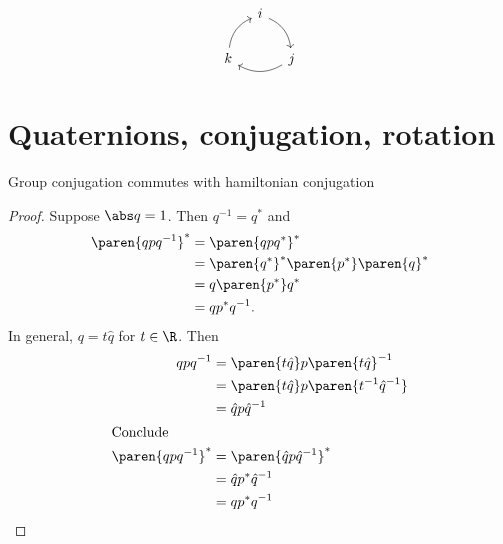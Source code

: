 \documentclass{scrartcl}
\begin{document}
\begin{multicols*}{2}
\[
  \begin{tikzcd}[column sep = 1em]
    & i \ar[bend left]{dr}\\
    k\ar[bend left]{ur} & &j \ar[bend left]{ll}
  \end{tikzcd}
\]
  \section{Quaternions, conjugation, rotation}
%
  \begin{lemma}
    Group conjugation commutes with hamiltonian conjugation
  \end{lemma}
  \begin{proof}
    Suppose \(\abs q=1\). Then \(q^{-1}=q^*\) and
    \begin{align*}
      \paren{qpq^{-1}}^* &= \paren{qpq^{*}}^* \\
                         &= \paren{q^*}^*\paren{p^*}\paren{q}^* \\
                         &= q\paren{p^*}q^* \\
                         &= q p^* q^{-1}.
    \end{align*}
    In general, \(q = t \hat q\) for \(t\in\R\). Then
    \begin{align*}
      qpq^{-1}&=\paren{t\hat q}p\paren{t\hat q}^{-1}  \\
              &= \paren{t\hat q} p \paren{t^{-1}\hat q^{-1}} \\
              &= \hat q p \hat q^{-1} \\
      \shortintertext{Conclude}
      \paren{qpq^{-1}}^* &= \paren{\hat q p \hat q^{-1}}^* \\
              &= \hat q p^* \hat q^{-1} \\
              &= qp^* q^{-1}
    \end{align*}


\end{proof}
\end{multicols*}
\end{document}
